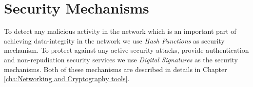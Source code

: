 



\section{Security Mechanisms}
	To detect any malicious activity in the network which is an important part of achieving data-integrity in the network we use \textit{Hash Functions} as security mechanism.
	To protect against any active security attacks, provide authentication and non-repudiation security services we use \textit{Digital Signatures} as the security mechanisms.
	Both of these mechanisms are described in details in Chapter \ref{cha:Networking and Cryptography tools}.	